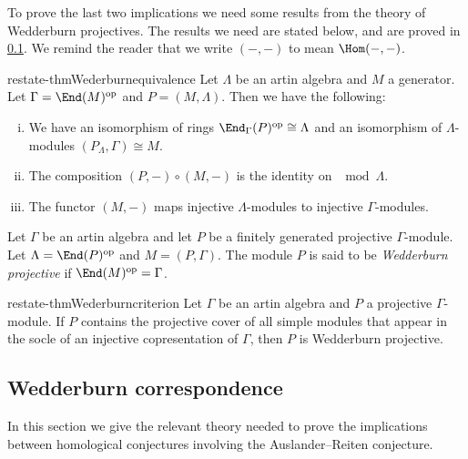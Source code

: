To prove the last two implications we need some results from the theory of Wedderburn projectives. The results we need are stated below, and are proved in \cref{sec:wedderburn_correspondence}. We remind the reader that we write $(-,-)$ to mean $\Hom(-,-)$.

\begin{restatable}{restate-thm}{Wederburnequivalence} \label{thm:hom_generator_equivalence}
	Let $\Lambda$ be an artin algebra and $M$ a generator. Let $\Gamma = \End(M)^{\operatorname{op}}$ and $P=(M, \Lambda)$. Then we have the following:
	\begin{enumerate}[i)]
		\item We have an isomorphism of rings $\End_\Gamma(P)^{\operatorname{op}} \cong \Lambda$ and an isomorphism of $\Lambda$-modules $(P_\Lambda, \Gamma) \cong M$.
		\item The composition $(P,-)\circ (M,-)$ is the identity on $\mod\Lambda$.
		\item The functor $(M,-)$ maps injective $\Lambda$-modules to injective $\Gamma$-modules. 
	\end{enumerate}
\end{restatable}

\begin{defn}
	Let $\Gamma$ be an artin algebra and let $P$ be a finitely generated projective $\Gamma$-module. Let $\Lambda = \End(P)^{\operatorname{op}}$ and $M=(P, \Gamma)$. The module $P$ is said to be \emph{Wedderburn projective} if $\End(M)^{\operatorname{op}}=\Gamma$.
\end{defn}

\begin{restatable}{restate-thm}{Wederburncriterion}\label{thm:wedderburn_criterion}
	Let $\Gamma$ be an artin algebra and $P$ a projective $\Gamma$-module. If $P$ contains the projective cover of all simple modules that appear in the socle of an injective copresentation of $\Gamma$, then $P$ is Wedderburn projective.
\end{restatable}

\subsection{Wedderburn correspondence}\label{sec:wedderburn_correspondence}

In this section we give the relevant theory needed to prove the implications between homological conjectures involving the Auslander--Reiten conjecture.

